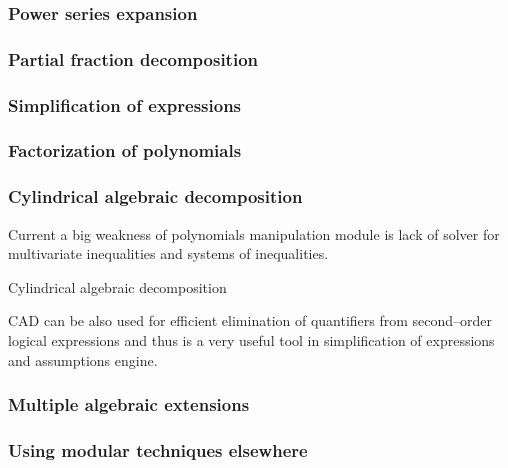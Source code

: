 \subsubsection{Power series expansion}

\cite{Gruntz1996limits}
\cite{Zippel1976expansions}
\cite{Brent1978fps}
\cite{Brent1975series}


\subsubsection{Partial fraction decomposition}

\cite{Bronstein1993partial}
\cite{Wang1981partial}


\subsubsection{Simplification of expressions}

\cite{Monagan2006modulo}
\cite{Pearce2001relations}
\cite{Moses1971simplification}


\subsubsection{Factorization of polynomials}

\cite{Gathen1983polytime}


\subsubsection{Cylindrical algebraic decomposition}

Current a big weakness of polynomials manipulation module is lack of solver for multivariate
inequalities and systems of inequalities.

Cylindrical algebraic decomposition

\cite{Arnon1984basic}
\cite{Jirstrand1995cylindrical}

CAD can be also used for efficient elimination of quantifiers from second--order logical
expressions and thus is a very useful tool in simplification of expressions and assumptions engine.


\subsubsection{Multiple algebraic extensions}

\cite{vanHoeij2002modgcd}


\subsubsection{Using modular techniques elsewhere}

\cite{Gerhard2006modular}

